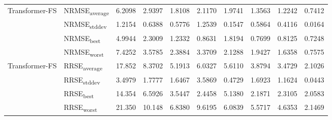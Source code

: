 {\begin{longtable}{l l c c c c c c c c}
\cmidrule(lr){2-10}
\multirow{4}{*}{Transformer-FS} & NRMSE\textsubscript{average} & 6.2098 & 2.9397 & 1.8108 & 2.1170 & 1.9741 & 1.3563 & 1.2242 & 0.7412 \\
 & NRMSE\textsubscript{stddev} & 1.2154 & 0.6388 & 0.5776 & 1.2539 & 0.1547 & 0.5864 & 0.4116 & 0.0164 \\
 & NRMSE\textsubscript{best} & 4.9944 & 2.3009 & 1.2332 & 0.8631 & 1.8194 & 0.7699 & 0.8125 & 0.7248 \\
 & NRMSE\textsubscript{worst} & 7.4252 & 3.5785 & 2.3884 & 3.3709 & 2.1288 & 1.9427 & 1.6358 & 0.7575 \\
\cmidrule(lr){2-10}
\multirow{4}{*}{Transformer-FS} & RRSE\textsubscript{average} & 17.852 & 8.3702 & 5.1913 & 6.0327 & 5.6110 & 3.8794 & 3.4729 & 2.1026 \\
 & RRSE\textsubscript{stddev} & 3.4979 & 1.7777 & 1.6467 & 3.5869 & 0.4729 & 1.6923 & 1.1624 & 0.0443 \\
 & RRSE\textsubscript{best} & 14.354 & 6.5926 & 3.5447 & 2.4458 & 5.1380 & 2.1871 & 2.3105 & 2.0583 \\
 & RRSE\textsubscript{worst} & 21.350 & 10.148 & 6.8380 & 9.6195 & 6.0839 & 5.5717 & 4.6353 & 2.1469 \\
\cmidrule(lr){2-10}
\end{longtable}
}